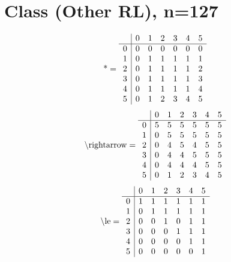 \documentclass[11pt]{article}
\begin{document}
\section{Class (Other RL), n=127}
\[\text{*} = 
\begin{array}{r | r r r r r r}
 & 0 & 1 & 2 & 3 & 4 & 5 \\ \hline
0 & 0 & 0 & 0 & 0 & 0 & 0 \\
1 & 0 & 1 & 1 & 1 & 1 & 1 \\
2 & 0 & 1 & 1 & 1 & 1 & 2 \\
3 & 0 & 1 & 1 & 1 & 1 & 3 \\
4 & 0 & 1 & 1 & 1 & 1 & 4 \\
5 & 0 & 1 & 2 & 3 & 4 & 5 \\
\end{array}
\]
\[\text{\textbackslash rightarrow} = 
\begin{array}{r | r r r r r r}
 & 0 & 1 & 2 & 3 & 4 & 5 \\ \hline
0 & 5 & 5 & 5 & 5 & 5 & 5 \\
1 & 0 & 5 & 5 & 5 & 5 & 5 \\
2 & 0 & 4 & 5 & 4 & 5 & 5 \\
3 & 0 & 4 & 4 & 5 & 5 & 5 \\
4 & 0 & 4 & 4 & 4 & 5 & 5 \\
5 & 0 & 1 & 2 & 3 & 4 & 5 \\
\end{array}
\]
\[\text{\textbackslash le} = 
\begin{array}{r | r r r r r r}
 & 0 & 1 & 2 & 3 & 4 & 5 \\ \hline
0 & 1 & 1 & 1 & 1 & 1 & 1 \\
1 & 0 & 1 & 1 & 1 & 1 & 1 \\
2 & 0 & 0 & 1 & 0 & 1 & 1 \\
3 & 0 & 0 & 0 & 1 & 1 & 1 \\
4 & 0 & 0 & 0 & 0 & 1 & 1 \\
5 & 0 & 0 & 0 & 0 & 0 & 1 \\
\end{array}
\]
\end{document}

